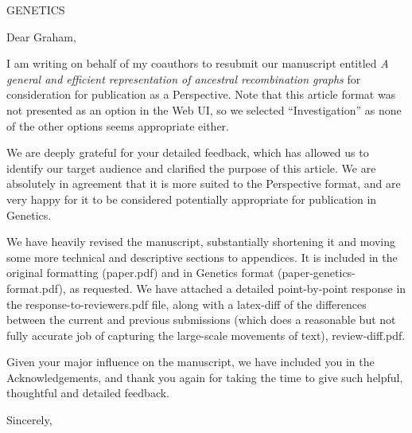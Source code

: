 \documentclass{letter}
\begin{document}
\begin{letter}{GENETICS}

\opening{Dear Graham,}

I am writing on behalf of my coauthors to resubmit our 
manuscript entitled
\emph{A general and efficient representation of ancestral recombination graphs}
for consideration for publication as a Perspective. Note that this article 
format was not presented as an option in the Web UI, so we selected 
``Investigation'' as none of the other options seems appropriate either.

We are deeply grateful for your detailed feedback, which has allowed us 
to identify our target audience and clarified the purpose of this article.
We are absolutely in agreement that it is more suited to the Perspective
format, and are very happy for it to be considered potentially appropriate
for publication in Genetics.

We have heavily revised the manuscript, substantially shortening it
and moving some more technical and descriptive sections to appendices.
It is included in the original formatting (paper.pdf)
and in Genetics format (paper-genetics-format.pdf), as requested.
We have attached a detailed point-by-point response in the 
response-to-reviewers.pdf file, along with a 
latex-diff of the differences between the current and previous submissions
(which does a reasonable but not fully accurate job of capturing the large-scale
movements of text), review-diff.pdf.

Given your major influence on the manuscript, we have included you in the
Acknowledgements, and thank you again for taking the time to give
such helpful, thoughtful and detailed feedback.

\closing{Sincerely,}

\end{letter}
\end{document}
